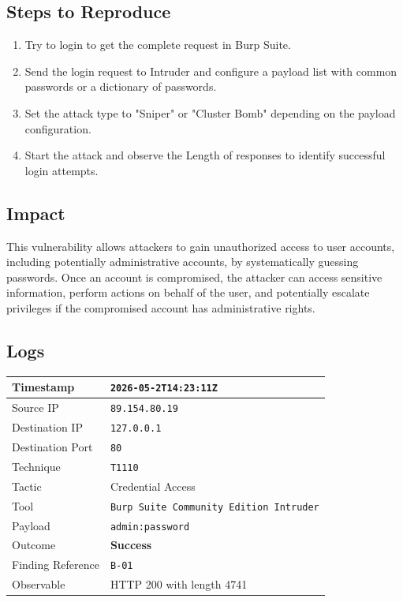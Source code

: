 \documentclass[11pt,a4paper]{report}
\begin{document}
    \subsection*{Steps to Reproduce}
    \begin{enumerate}
        \item Try to login to get the complete request in Burp Suite.
        \item Send the login request to Intruder and configure a payload list with common passwords or a dictionary of passwords.
        \item Set the attack type to "Sniper" or "Cluster Bomb" depending on the payload configuration.
        \item Start the attack and observe the Length of responses to identify successful login attempts. 
    \end{enumerate}

    \subsection*{Impact}
    This vulnerability allows attackers to gain unauthorized access to user accounts, including potentially administrative accounts, by systematically guessing passwords. Once an account is compromised, the attacker can access sensitive information, perform actions on behalf of the user, and potentially escalate privileges if the compromised account has administrative rights.

    \newpage
    \subsection*{Logs}
    \begin{table}[h!]
    \centering
    \renewcommand{\arraystretch}{1.3}
    \begin{tabular}{|p{4cm}|p{9cm}|}
    \hline
    Timestamp & \texttt{2026-05-2T14:23:11Z} \\
    \hline
    Source IP & \texttt{89.154.80.19} \\
    \hline
    Destination IP & \texttt{127.0.0.1} \\
    \hline
    Destination Port & \texttt{80} \\
    \hline
    Technique & \texttt{T1110} \\
    \hline
    Tactic & Credential Access \\
    \hline
    Tool & \texttt{Burp Suite Community Edition Intruder} \\
    \hline
    Payload & \texttt{admin:password} \\
    \hline
    Outcome & \textbf{Success} \\
    \hline
    Finding Reference & \texttt{B-01} \\
    \hline
    Observable & HTTP 200 with length 4741 \\
    \hline
    \end{tabular}
    \end{table}
\end{document}
